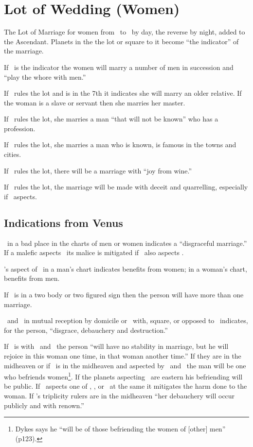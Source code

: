 \section{Lot of Wedding (Women)}
The Lot of Marriage for women from \Venus\, to \Saturn\, by day, the reverse by night, added to the Ascendant. Planets in the the lot or square to it become ``the indicator'' of the marriage.

If \Mars\, is the indicator the women will marry a number of men in succession and ``play the whore with men.''

If \Saturn\, rules the lot and is in the 7th it indicates she will marry an older relative. If the woman is a slave or servant then she marries her master.

If \Mars\, rules the lot, she marries a man ``that will not be known'' who has a \Mars\, profession.

If \Jupiter\, rules the lot, she marries a man who is known, is famous in the towns and cities.

If \Venus\, rules the lot, there will be a marriage with ``joy from wine.''

If \Mercury\ rules the lot, the marriage will be made with deceit and quarrelling, especially if \Mars\, aspects.

\subsection{Indications from Venus}
\Venus\, in a bad place in the charts of men or women indicates a ``disgraceful marriage.'' If a malefic aspects \Venus\, its malice is mitigated if \Jupiter\, also aspects \Venus. 

\Jupiter's aspect of \Venus\, in a man's chart indicates benefits from women; in a woman's chart, benefits from men.

If \Venus\, is in a two body or two figured sign then the person will have more than one marriage.

\Venus\, and \Mars\, in mutual reception by domicile or \Mars\, with, square, or opposed to \Venus\, indicates, for the person, ``disgrace, debauchery and destruction.''

If \Venus\, is with \Mercury\, and \Mars\, the person ``will have no stability in marriage, but he will rejoice in this woman one time, in that woman another time.'' If they are in the midheaven or if \Venus\, is in the midheaven and aspected by \Mercury\, and \Mars\, the man will be one who befriends women\footnote{Dykes says he ``will be of those befriending the women of [other] men'' (p123).}. If the planets aspecting \Venus\, are eastern his befriending will be public. If \Jupiter\, aspects one of \Venus, \Mercury, or \Mars\, at the same it mitigates the harm done to the woman. If \Venus's triplicity rulers are in the midheaven ``her debauchery will occur publicly and with renown.''

